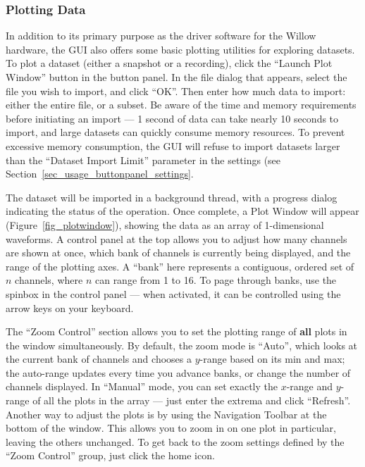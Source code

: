 \subsubsection{Plotting Data}
\label{sec_usage_buttonpanel_plot}

In addition to its primary purpose as the driver software for the Willow hardware, the GUI also offers some basic plotting utilities for exploring datasets. To plot a dataset (either a snapshot or a recording), click the ``Launch Plot Window'' button in the button panel. In the file dialog that appears, select the file you wish to import, and click ``OK''. Then enter how much data to import: either the entire file, or a subset. Be aware of the time and memory requirements before initiating an import --- 1 second of data can take nearly 10 seconds to import, and large datasets can quickly consume memory resources. To prevent excessive memory consumption, the GUI will refuse to import datasets larger than the ``Dataset Import Limit'' parameter in the settings (see Section~\ref{sec_usage_buttonpanel_settings}.

The dataset will be imported in a background thread, with a progress dialog indicating the status of the operation. Once complete, a Plot Window will appear (Figure~\ref{fig_plotwindow}), showing the data as an array of 1-dimensional waveforms. A control panel at the top allows you to adjust how many channels are shown at once, which bank of channels is currently being displayed, and the range of the plotting axes. A ``bank'' here represents a contiguous, ordered set of $n$ channels, where $n$ can range from 1 to 16. To page through banks, use the spinbox in the control panel --- when activated, it can be controlled using the arrow keys on your keyboard.

The ``Zoom Control'' section allows you to set the plotting range of \textbf{all} plots in the window simultaneously. By default, the zoom mode is ``Auto'', which looks at the current bank of channels and chooses a $y$-range based on its min and max; the auto-range updates every time you advance banks, or change the number of channels displayed. In ``Manual'' mode, you can set exactly the $x$-range and $y$-range of all the plots in the array --- just enter the extrema and click ``Refresh''. Another way to adjust the plots is by using the Navigation Toolbar at the bottom of the window. This allows you to zoom in on one plot in particular, leaving the others unchanged. To get back to the zoom settings defined by the ``Zoom Control'' group, just click the home icon.

